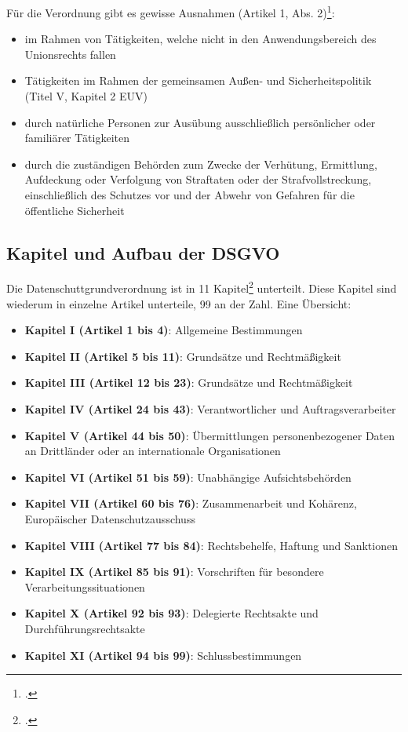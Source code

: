 Für die Verordnung gibt es gewisse Ausnahmen (Artikel 1, Abs. 2)\footcite{Lehrunterlagen-HTL-cloud}:
\begin{itemize}
	\item im Rahmen von Tätigkeiten, welche nicht in den Anwendungsbereich des Unionsrechts fallen
	\item Tätigkeiten im Rahmen der gemeinsamen Außen- und Sicherheitspolitik (Titel V, Kapitel 2 EUV)
	\item durch natürliche Personen zur Ausübung ausschließlich persönlicher oder familiärer Tätigkeiten
	\item durch die zuständigen Behörden zum Zwecke der Verhütung, Ermittlung, Aufdeckung oder Verfolgung von Straftaten oder der Strafvollstreckung, einschließlich des Schutzes vor und der Abwehr von Gefahren für die öffentliche Sicherheit
\end{itemize}

\subsection{Kapitel und Aufbau der DSGVO}
Die Datenschuttgrundverordnung ist in 11 Kapitel\footcite{dsgvo-wiki} unterteilt. Diese Kapitel sind wiederum in einzelne Artikel unterteile, 99 an der Zahl. Eine Übersicht:

\begin{itemize}
	\item \textbf{Kapitel I (Artikel 1 bis 4)}: Allgemeine Bestimmungen
	\item \textbf{Kapitel II (Artikel 5 bis 11)}: Grundsätze und Rechtmäßigkeit
	\item \textbf{Kapitel III (Artikel 12 bis 23)}: Grundsätze und Rechtmäßigkeit
	\item \textbf{Kapitel IV (Artikel 24 bis 43)}: Verantwortlicher und Auftragsverarbeiter
	\item \textbf{Kapitel V (Artikel 44 bis 50)}: Übermittlungen personenbezogener Daten an Drittländer oder an internationale Organisationen
	\item \textbf{Kapitel VI (Artikel 51 bis 59)}: Unabhängige Aufsichtsbehörden
	\item \textbf{Kapitel VII (Artikel 60 bis 76)}: Zusammenarbeit und Kohärenz, Europäischer Datenschutzausschuss
	\item \textbf{Kapitel VIII (Artikel 77 bis 84)}: Rechtsbehelfe, Haftung und Sanktionen
	\item \textbf{Kapitel IX (Artikel 85 bis 91)}: Vorschriften für besondere Verarbeitungssituationen
	\item \textbf{Kapitel X (Artikel 92 bis 93)}: Delegierte Rechtsakte und Durchführungsrechtsakte
	\item \textbf{Kapitel XI (Artikel 94 bis 99)}: Schlussbestimmungen
\end{itemize}

